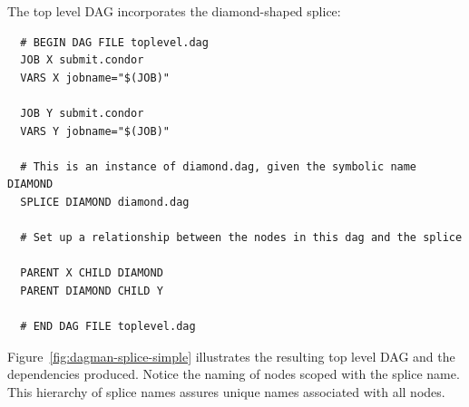 The top level DAG incorporates the diamond-shaped splice:

\begin{verbatim}
  # BEGIN DAG FILE toplevel.dag
  JOB X submit.condor
  VARS X jobname="$(JOB)"

  JOB Y submit.condor
  VARS Y jobname="$(JOB)"

  # This is an instance of diamond.dag, given the symbolic name DIAMOND
  SPLICE DIAMOND diamond.dag

  # Set up a relationship between the nodes in this dag and the splice

  PARENT X CHILD DIAMOND
  PARENT DIAMOND CHILD Y

  # END DAG FILE toplevel.dag
\end{verbatim}

Figure~\ref{fig:dagman-splice-simple} illustrates the resulting
top level DAG and the dependencies produced. 
Notice the naming of nodes
scoped with the splice name.
This hierarchy of splice names assures unique names associated with all nodes.

